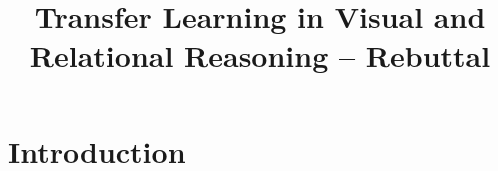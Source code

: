 \documentclass[10pt,twocolumn,letterpaper]{article}
\begin{document}
\title{Transfer Learning in Visual and Relational Reasoning -- Rebuttal}

\maketitle
\thispagestyle{empty}


\section{Introduction}


{\small


}
\end{document}

